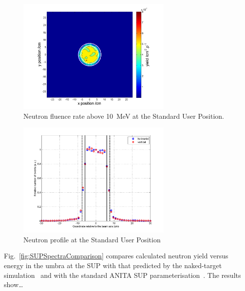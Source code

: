 \documentclass[11pt,a4paper]{IEEEtran}
\let\MYoriglatexcaption\caption
\renewcommand{\caption}[2][\relax]{\MYoriglatexcaption[#2]{#2}}
\begin{document}
\begin{figure}[t]
    \includegraphics[width=3in]{SUP10ColSpatialDistribution10MeVRADECS.png}
    \caption{Neutron fluence rate above \SI{10}{\MeV} at the Standard User Position.}
    \label{fig:SUPDensity}
\end{figure}

\begin{figure}[t]
    \includegraphics[width=3in]{SUP10beamproFoldingRADECS.png}
    \caption{Neutron profile at the Standard User Position}
    \label{fig:SUPProfile}
\end{figure}

Fig.~\ref{fig:SUPSpectraComparison} compares calculated neutron yield versus energy in the umbra at the SUP with that predicted by the naked-target simulation~\cite{Platt13} and with the standard ANITA SUP parameterisation~\cite{Prokofiev2009}.
The results show\ldots{}
\end{document}
